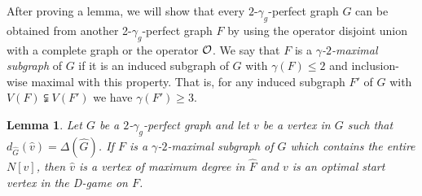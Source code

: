 \documentclass[12pt]{article}
\newtheorem{lemma}[theorem]{Lemma}
\newcommand{\cO}{{\cal O}}
\begin{document}
After proving a lemma, we will show that every $2$-$\gamma_g$-perfect graph $G$ can be obtained from another 2-$\gamma_g$-perfect graph $F$ by using the operator disjoint union with a complete graph or the operator $\cO$. 
We say that $F$ is a \emph{$\gamma$-$2$-maximal subgraph} of $G$ if it is an induced subgraph of $G$ with $\gamma(F)\le 2$  and inclusion-wise maximal with this property. That is, for any induced subgraph $F'$ of $G$ with $V(F) \subsetneqq V(F')$ we have $\gamma(F')\ge 3$. 

\begin{lemma}
	\label{lemma:2-max}	
	Let $G$ be a  $2$-$\gamma_g$-perfect graph and let $v$ be a vertex in $G$ such that $d_{\widehat{G}}(\widehat{v})=\Delta(\widehat{G})$. If $F$ is a $\gamma$-$2$-maximal subgraph of $G$ which contains the entire $N[v]$, then $\widehat{v}$ is a vertex of maximum degree in $\widehat{F}$ and $v$ is an optimal start vertex in the D-game on $F$.
\end{lemma}
\end{document}
